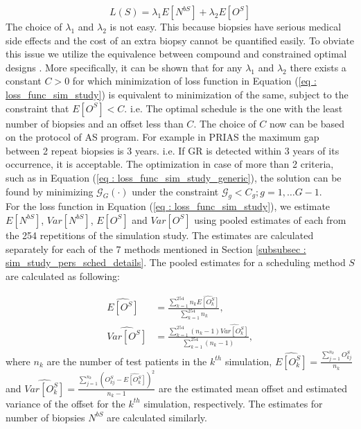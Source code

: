 \begin{equation}
\label{eq : loss_func_sim_study}
L(S) = \lambda_1 E[N^{bS}] + \lambda_2 E[O^S] 
\end{equation}
The choice of $\lambda_1$ and $\lambda_2$ is not easy. This because biopsies have serious medical side effects and the cost of an extra biopsy cannot be quantified easily. To obviate this issue we utilize the equivalence between compound and constrained optimal designs \citep{cook1994equivalence}. More specifically, it can be shown that for any $\lambda_1$ and $\lambda_2$ there exists a constant $C>0$ for which minimization of loss function in Equation (\ref{eq : loss_func_sim_study}) is equivalent to minimization of the same, subject to the constraint that $E[O^S] < C$. i.e. The optimal schedule is the one with the least number of biopsies and an offset less than $C$. The choice of $C$ now can be based on the protocol of AS program. For example in PRIAS the maximum gap between 2 repeat biopsies is 3 years. i.e. If GR is detected within 3 years of its occurrence, it is acceptable. The optimization in case of more than 2 criteria, such as in Equation (\ref{eq : loss_func_sim_study_generic}), the solution can be found by minimizing $\mathcal{G}_G(\cdot)$ under the constraint $\mathcal{G}_g < C_g; g=1, \ldots G-1$.\\

For the loss function in Equation (\ref{eq : loss_func_sim_study}), we estimate $E[N^{bS}]$, $Var[N^{bS}]$, $E[O^S]$ and $Var[O^S]$ using pooled estimates of each from the 254 repetitions of the simulation study. The estimates are calculated separately for each of the 7 methods mentioned in Section \ref{subsubsec : sim_study_pers_sched_details}. The pooled estimates for a scheduling method $S$ are calculated as following:

\begin{align*}
\widehat{E[O^S]} &= \frac{\sum_{k=1}^{254} n_k \widehat{E[O^S_k]}}{\sum_{k=1}^{254} n_k}, \\
\widehat{Var[O^S]} &= \frac{\sum_{k=1}^{254} (n_k - 1) \widehat{Var[O^S_k]}}{\sum_{k=1}^{254} (n_k-1)}, 
\end{align*}
where $n_k$ are the number of test patients in the $k^{th}$ simulation, $\widehat{E[O^S_k]} = \frac{\sum_{j=1}^{n_k}O^S_{kj}}{n_k}$ and $\widehat{Var[O^S_k]} = \frac{\sum_{j=1}^{n_k}(O^S_{kj} - \widehat{E[O^S_k]})^2}{n_k-1}$ are the estimated mean offset and estimated variance of the offset for the $k^{th}$ simulation, respectively. The estimates for number of biopsies $N^{bS}$ are calculated similarly.

